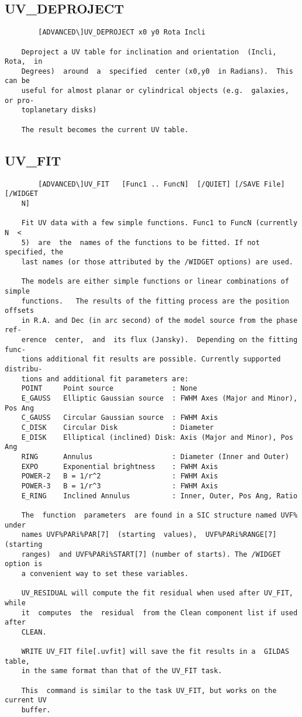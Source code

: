 \subsection{UV\_DEPROJECT}
\begin{verbatim}
        [ADVANCED\]UV_DEPROJECT x0 y0 Rota Incli

    Deproject a UV table for inclination and orientation  (Incli,  Rota,  in
    Degrees)  around  a  specified  center (x0,y0  in Radians).  This can be
    useful for almost planar or cylindrical objects (e.g.  galaxies, or pro-
    toplanetary disks)

    The result becomes the current UV table.

\end{verbatim}
\subsection{UV\_FIT}
\begin{verbatim}
        [ADVANCED\]UV_FIT   [Func1 .. FuncN]  [/QUIET] [/SAVE File] [/WIDGET
    N]

    Fit UV data with a few simple functions. Func1 to FuncN (currently  N  <
    5)  are  the  names of the functions to be fitted. If not specified, the
    last names (or those attributed by the /WIDGET options) are used.

    The models are either simple functions or linear combinations of  simple
    functions.   The results of the fitting process are the position offsets
    in R.A. and Dec (in arc second) of the model source from the phase  ref-
    erence  center,  and  its flux (Jansky).  Depending on the fitting func-
    tions additional fit results are possible. Currently supported distribu-
    tions and additional fit parameters are:
    POINT     Point source              : None
    E_GAUSS   Elliptic Gaussian source  : FWHM Axes (Major and Minor), Pos Ang
    C_GAUSS   Circular Gaussian source  : FWHM Axis
    C_DISK    Circular Disk             : Diameter
    E_DISK    Elliptical (inclined) Disk: Axis (Major and Minor), Pos Ang
    RING      Annulus                   : Diameter (Inner and Outer)
    EXPO      Exponential brightness    : FWHM Axis
    POWER-2   B = 1/r^2                 : FWHM Axis
    POWER-3   B = 1/r^3                 : FWHM Axis
    E_RING    Inclined Annulus          : Inner, Outer, Pos Ang, Ratio

    The  function  parameters  are found in a SIC structure named UVF% under
    names UVF%PARi%PAR[7]  (starting  values),  UVF%PARi%RANGE[7]  (starting
    ranges)  and UVF%PARi%START[7] (number of starts). The /WIDGET option is
    a convenient way to set these variables.

    UV_RESIDUAL will compute the fit residual when used after UV_FIT,  while
    it  computes  the  residual  from the Clean component list if used after
    CLEAN.

    WRITE UV_FIT file[.uvfit] will save the fit results in a  GILDAS  table,
    in the same format than that of the UV_FIT task.

    This  command is similar to the task UV_FIT, but works on the current UV
    buffer.

\end{verbatim}

